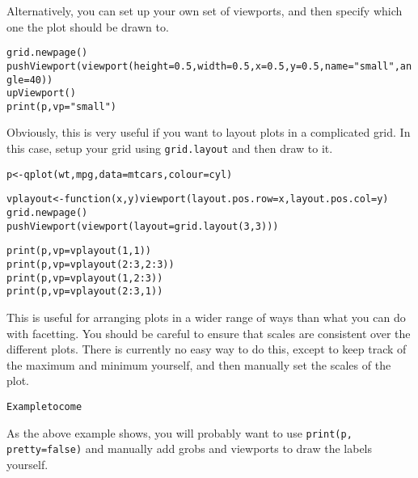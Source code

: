 Alternatively, you can set up your own set of viewports, and then specify which one the plot should be drawn to.

\begin{alltt}
grid.newpage()
pushViewport(viewport(height=0.5, width=0.5, x=0.5, y=0.5, name="small", angle=40))
upViewport()
print(p, vp="small")
\end{alltt}

Obviously, this is very useful if you want to layout plots in a complicated grid.  In this case, setup your grid using {\tt grid.layout} and then draw to it.

\begin{alltt}
p <- qplot(wt, mpg, data=mtcars, colour=cyl)

vplayout <- function(x, y) viewport(layout.pos.row=x, layout.pos.col=y)
grid.newpage()
pushViewport(viewport(layout=grid.layout(3,3)))

print(p, vp=vplayout(1,1))
print(p, vp=vplayout(2:3,2:3))
print(p, vp=vplayout(1, 2:3))
print(p, vp=vplayout(2:3, 1))
\end{alltt}

This is useful for arranging plots in a wider range of ways than what you can do with facetting.   You should be careful to ensure that scales are consistent over the different plots.  There is currently no easy way to do this, except to keep track of the maximum and minimum yourself, and then manually set the scales of the plot.

\begin{alltt}
Example to come
\end{alltt}

As the above example shows, you will probably want to use {\tt print(p, pretty=false)} and manually add grobs and viewports to draw the labels yourself.


